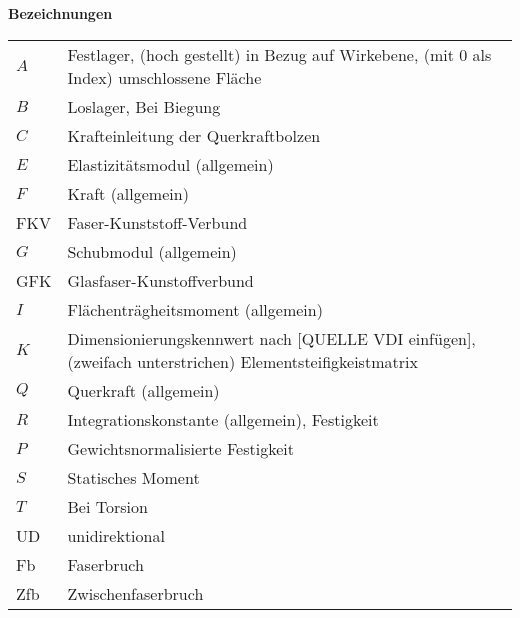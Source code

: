 \textbf{Bezeichnungen}
\begin{table}[h]

\begin{tabular}{ll}
	$ A $&Festlager, (hoch gestellt) in Bezug auf Wirkebene, (mit 0 als Index) umschlossene Fläche\\
	$ B $&Loslager, Bei Biegung\\
	$ C $&Krafteinleitung der Querkraftbolzen\\
	$ E $&Elastizitätsmodul (allgemein)\\
	$ F $&Kraft (allgemein)\\
	FKV&Faser-Kunststoff-Verbund\\
	$ G $&Schubmodul (allgemein)\\
	GFK& Glasfaser-Kunstoffverbund\\
	$ I $&Flächenträgheitsmoment (allgemein)\\
	$ K $&Dimensionierungskennwert nach [QUELLE VDI einfügen], (zweifach unterstrichen) Elementsteifigkeistmatrix\\
	$ Q $&Querkraft (allgemein)\\
	$ R $&Integrationskonstante (allgemein), Festigkeit\\
	$ P $&Gewichtsnormalisierte Festigkeit\\
	$ S $&Statisches Moment\\
	$ T $&Bei Torsion\\
	UD&unidirektional\\
	Fb&Faserbruch\\
	Zfb&Zwischenfaserbruch\\
	
	
\end{tabular}
\end{table}

